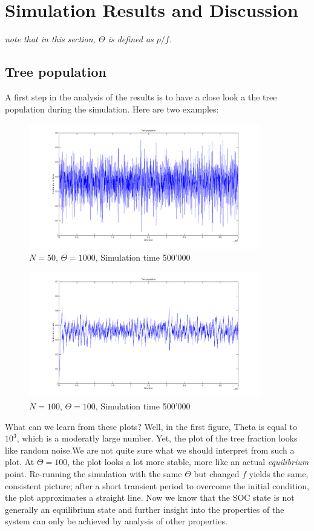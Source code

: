 \documentclass[11pt]{article}
\begin{document}
\section{Simulation Results and Discussion}
\emph{note that in this section, $\Theta$ is defined as $p/f$.}
\subsection{Tree population}
A first step in the analysis of the results is to have a close look a the tree population during the simulation. Here are two examples:
\begin{figure}[H]
\centering
\includegraphics[width=0.9\textwidth,keepaspectratio=true,]{Pictures/Tree_Pop_50_1000_500000.png}
\caption{$N=50$, $\Theta=1000$, Simulation time 500'000}
\end{figure}
\begin{figure}[H]
\centering
\includegraphics[width=0.9\textwidth,keepaspectratio=true,]{Pictures/Tree_Pop_100_100_500000.png}
\caption{$N=100$, $\Theta=100$, Simulation time 500'000}
\end{figure}
What can we learn from these plots? Well, in the first figure, Theta is equal to $10^3$, which is a moderatly large number. Yet, the plot of the tree fraction looks like random noise.We are not quite sure what we should interpret from such a plot. At $\Theta=100$, the plot looks a lot more stable, more like an actual \emph{equilibrium} point. Re-running the simulation with the same $\Theta$ but changed $f$ yields the same, consistent picture; after a short transient period to overcome the initial condition, the plot approximates a straight line. 
Now we know that the SOC state is not generally an equilibrium state and further insight into the properties of the system can only be achieved by analysis of other properties.
\end{document}

